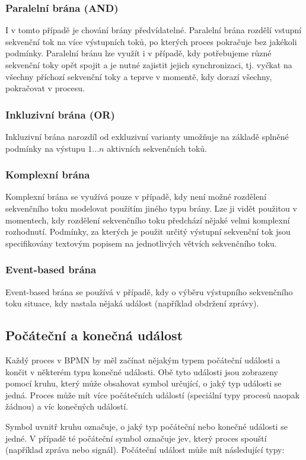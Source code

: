 \documentclass[]{article}
\begin{document}
\subsubsection{Paralelní brána (AND)}
I v tomto případě je chování brány předvídatelné. Paralelní brána rozdělí vstupní sekvenční tok na více výstupních toků, po kterých proces pokračuje bez jakékoli podmínky. Paralelní bránu lze využít i v případě, kdy potřebujeme různé sekvenční toky opět spojit a je nutné zajistit jejich synchronizaci, tj. vyčkat na všechny příchozí sekvenční toky a teprve v momentě, kdy dorazí všechny, pokračovat v procesu.

\subsubsection{Inkluzivní brána (OR)}
Inkluzivní brána narozdíl od exkluzivní varianty umožňuje na základě splněné podmínky na výstupu $1...n$ aktivních sekvenčních toků.

\subsubsection{Komplexní brána}
Komplexní brána se využívá pouze v případě, kdy není možné rozdělení sekvenčního toku modelovat použitím jiného typu brány. Lze ji vidět použitou v momentech, kdy rozdělení sekvenčního toku předchází nějaké velmi komplexní rozhodnutí. Podmínky, za kterých je použit určitý výstupní sekvenční tok jsou specifikovány textovým popisem na jednotlivých větvích sekvenčního toku.

\subsubsection{Event-based brána}
Event-based brána se používá v případě, kdy o výběru výstupního sekvenčního toku  situace, kdy nastala nějaká událost (například obdržení zprávy).

\subsection{Počáteční a konečná událost}
Každý proces v BPMN by měl začínat nějakým typem počáteční události a končit v některém typu konečné události. Obě tyto události jsou zobrazeny pomocí kruhu, který může obsahovat symbol určující, o jaký typ události se jedná. Proces může mít více počátečních událostí (speciální typy procesů naopak žádnou) a víc konečných událostí.

Symbol uvnitř kruhu označuje, o jaký typ počáteční nebo konečné události se jedné. V případě té počáteční symbol označuje jev, který proces spouští (například zpráva nebo signál). Počáteční událost může mít následující typy:
\end{document}
